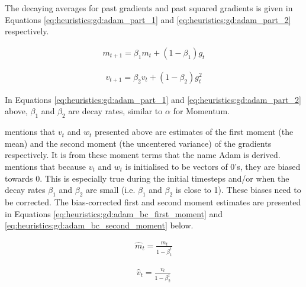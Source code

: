 The decaying averages for past gradients and past squared gradients is given in Equations \ref{eq:heuristics:gd:adam_part_1} and \ref{eq:heuristics:gd:adam_part_2} respectively.

\begin{equation}
      \label{eq:heuristics:gd:adam_part_1}
      \begin{split}
            m_{t+1} = \beta_{1}m_{t} + (1 - \beta_{1})g_{t}
      \end{split}
\end{equation}


\begin{equation}
      \label{eq:heuristics:gd:adam_part_2}
      \begin{split}
            v_{t+1} = \beta_{2}v_{t} + (1 - \beta_{2})g^{2}_{t}
      \end{split}
\end{equation}

In Equations \ref{eq:heuristics:gd:adam_part_1} and \ref{eq:heuristics:gd:adam_part_2} above, $\beta_{1}$ and $\beta_{2}$ are decay rates, similar to $\alpha$ for \ac{Momentum}.

\citeauthor{ref:ruder:2016} \cite{ref:ruder:2016} mentions that $v_{t}$ and $w_{t}$ presented above are estimates of the first moment (the mean) and the second moment (the uncentered variance) of the gradients respectively. It is from these moment terms that the name \acl{Adam} is derived. \citeauthor{ref:kingma:2014} \cite{ref:kingma:2014} mentions that because $v_{t}$ and $w_{t}$ is initialised to be vectors of 0's, they are biased towards 0. This is especially true during the initial timesteps and/or when the decay rates $\beta_{1}$ and $\beta_{2}$ are small (i.e. $\beta_{1}$ and $\beta_{2}$ is close to 1). These biases need to be corrected. The bias-corrected first and second moment estimates are presented in Equations \ref{eq:heuristics:gd:adam_bc_first_moment} and \ref{eq:heuristics:gd:adam_bc_second_moment} below.

\begin{equation}
      \label{eq:heuristics:gd:adam_bc_first_moment}
      \begin{split}
            \hat{m}_{t} = \frac{m_{t}}{1 - \beta^{t}_{1}}
      \end{split}
\end{equation}


\begin{equation}
      \label{eq:heuristics:gd:adam_bc_second_moment}
      \begin{split}
            \hat{v}_{t} = \frac{v_{t}}{1 - \beta^{t}_{2}}
      \end{split}
\end{equation}

